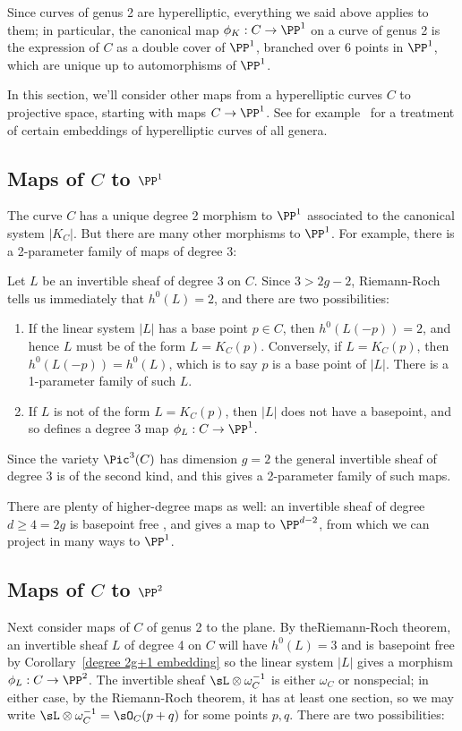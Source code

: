 Since  curves of genus 2 are hyperelliptic, everything we said above applies to them; in particular, the canonical map $\phi_K : C \to \PP^1$ on a curve of genus 2 is the expression of $C$ as a double cover of $\PP^1$, branched over 6 points in $\PP^1$, which are unique up to automorphisms of $\PP^1$. 

In this section, we'll consider other maps from a hyperelliptic curves $C$ to projective space, starting with maps $C \to \PP^1$.
See for example~\cite{transcanonical} for a treatment of certain embeddings of hyperelliptic curves of all genera.

\subsection{Maps of $C$ to $\PP^1$}\label{genus 2 pencil}

The curve $C$ has a unique degree 2 morphism to $\PP^1$  associated to the canonical system $|K_C|$. But there are many other morphisms to $\PP^1$. For example, there is a 2-parameter
family of maps of degree 3:

 Let $L$ be an invertible sheaf of degree 3 on $C$. Since $3 > 2g-2$, Riemann-Roch tells us immediately that $h^0(L) = 2$, and there are two possibilities:

\begin{enumerate}
\item If the linear system $|L|$ has a base point $p \in C$, then $h^0(L(-p)) = 2$, and hence $L$ must be of the form $L = K_C(p)$. Conversely, if $L = K_C(p)$, then $h^0(L(-p)) = h^0(L)$, which is to say $p$ is a base point of $|L|$. There is a 1-parameter family of such $L$.

\item If $L$ is not of the form $L = K_C(p)$, then $|L|$ does not have a basepoint, and so defines a degree 3 map $\phi_L : C \to \PP^1$.
\end{enumerate}

Since the variety $\Pic^3(C)$ has dimension $g= 2$ the general invertible sheaf of degree 3 is of the second kind, and this gives a 2-parameter family of such maps.

There are plenty of higher-degree maps as well: an invertible sheaf of degree $d \geq 4 = 2g$ is basepoint free
, and gives a map to $\PP^{d-2}$, from which we can project in many ways
to $\PP^1$.

\subsection{Maps of $C$ to $\PP^2$} 
Next consider maps of $C$ of genus 2 to the plane. By theRiemann-Roch theorem, an invertible sheaf $L$ of degree 4 on $C$ will have $h^0(L) = 3$ and is basepoint free by Corollary~\ref{degree 2g+1 embedding} so the linear system $|L|$  gives a morphism $\phi_L : C \to \PP^2$. The invertible sheaf $\sL\otimes \omega_C^{-1}$ is either
$\omega_C$ or nonspecial; in either case, by the Riemann-Roch theorem, it has at least one section, 
so we may write $\sL\otimes \omega_C^{-1} = \sO_C(p+q)$ for some points $p,q$. There are two possibilities:

